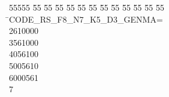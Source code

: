 %
%
\begin{tabbing}
55555 \= 55 \= 55 \= 55 \= 55 \= 55 \= 55 \= 55 \= 55 \= 55 \= 55 \= 55 \= 55 \= \>CODE\_RS\_F8\_N7\_K5\_D3\_GENMA=\\[0pt]
2610000\\[0pt]
3561000\\[0pt]
4056100\\[0pt]
5005610\\[0pt]
6000561\\[0pt]
7\>\end{tabbing}
